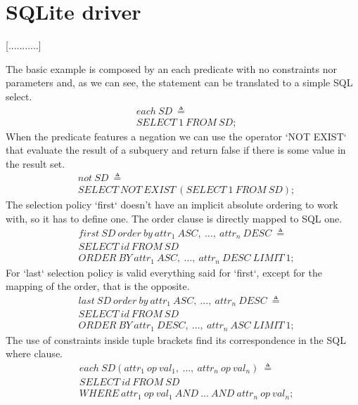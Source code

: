 \section{SQLite driver}
[...........]

The basic example is composed by an each predicate with no constraints nor parameters and, as we can see, the statement can be translated to a simple SQL select.
\begin{align*}%
&each\ SD\ \triangleq\\
&SELECT\ 1\ FROM\ SD;
\end{align*}
When the predicate features a negation we can use the operator `NOT EXIST` that evaluate the result of a subquery and return false if there is some value in the result set.
\begin{align*}%
&not\ SD\ \triangleq\\
&SELECT\ NOT\ EXIST\ (SELECT\ 1\ FROM\ SD);
\end{align*}
The selection policy `first` doesn't have an implicit absolute ordering to work with, so it has to define one. The order clause is directly mapped to SQL one.
\begin{align*}%
&first\ SD\ order\ by\ attr_1\ ASC,\ \ldots,\ attr_n\ DESC\ \triangleq\\
&SELECT\ id\ FROM\ SD\\
&ORDER\ BY\ attr_1\ ASC,\ \ldots,\ attr_n\ DESC\ LIMIT\ 1;
\end{align*}
For `last` selection policy is valid everything said for `first`, except for the mapping of the order, that is the opposite.
\begin{align*}%
&last\ SD\ order\ by\ attr_1\ ASC,\ \ldots,\ attr_n\ DESC\ \triangleq\\
&SELECT\ id\ FROM\ SD\\
&ORDER\ BY\ attr_1\ DESC,\ \ldots,\ attr_n\ ASC\ LIMIT\ 1;
\end{align*}
The use of constraints inside tuple brackets find its correspondence in the SQL where clause.
\begin{align*}%
&each\ SD(attr_1\ op \ val_1,\ \ldots,\ attr_n\ op \ val_n)\ \triangleq\\
&SELECT\ id\ FROM\ SD\\
&WHERE\ attr_1\ op\ val_1\ AND\ \ldots\ AND\ attr_n\ op\ val_n;
\end{align*}
